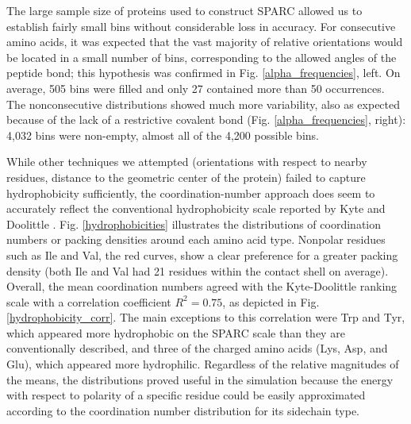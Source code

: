 \documentclass[11pt,titlepage]{article}
\begin{document}
The large sample size of proteins used to construct SPARC allowed us to establish fairly small bins without considerable loss in accuracy.
For consecutive amino acids, it was expected that the vast majority of relative orientations would be located in a small number of bins, corresponding to the allowed angles of the peptide bond; this hypothesis was confirmed in Fig. \ref{alpha_frequencies}, left.
On average, 505 bins were filled and only 27 contained more than 50 occurrences.
The nonconsecutive distributions showed much more variability, also as expected because of the lack of a restrictive covalent bond (Fig. \ref{alpha_frequencies}, right): 4,032 bins were non-empty, almost all of the {\raisetag{.17ex\hbox{$\scriptstyle\sim$}}}4,200 possible bins.

While other techniques we attempted (orientations with respect to nearby residues, distance to the geometric center of the protein) failed to capture hydrophobicity sufficiently, the coordination-number approach does seem to accurately reflect the conventional hydrophobicity scale reported by Kyte and Doolittle \cite{kyte}.
Fig. \ref{hydrophobicities} illustrates the distributions of coordination numbers or packing densities around each amino acid type.
Nonpolar residues such as Ile and Val, the red curves, show a clear preference for a greater packing density (both Ile and Val had 21 residues within the contact shell on average).
Overall, the mean coordination numbers agreed with the Kyte-Doolittle ranking scale with a correlation coefficient $R^2=0.75$, as depicted in Fig. \ref{hydrophobicity_corr}. 
The main exceptions to this correlation were Trp and Tyr, which appeared more hydrophobic on the SPARC scale than they are conventionally described, and three of the charged amino acids (Lys, Asp, and Glu), which appeared more hydrophilic.
Regardless of the relative magnitudes of the means, the distributions proved useful in the simulation because the energy with respect to polarity of a specific residue could be easily approximated according to the coordination number distribution for its sidechain type.
\end{document}
